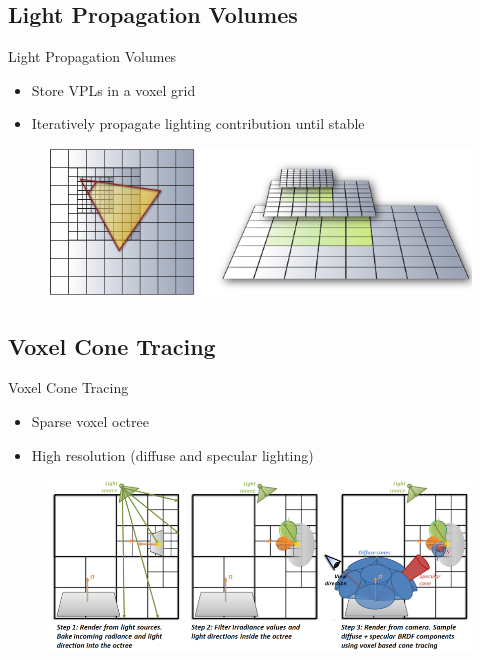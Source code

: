 \documentclass[10pt]{beamer}
\begin{document}
\subsection{Light Propagation Volumes}
\begin{frame}{Light Propagation Volumes}

  \begin{itemize}
    \item Store VPLs in a voxel grid
    \item Iteratively propagate lighting contribution until stable
  \end{itemize}

  \begin{figure}
    \includegraphics[width=\textwidth]{lpv.png}
  \end{figure}
\end{frame}

\subsection{Voxel Cone Tracing}
\begin{frame}{Voxel Cone Tracing}

  \begin{itemize}
    \item Sparse voxel octree %
    \item High resolution (diffuse and specular lighting)
  \end{itemize}

  \begin{figure}
    \includegraphics[width=\textwidth]{vct.png}
  \end{figure}
\end{frame}
\end{document}
